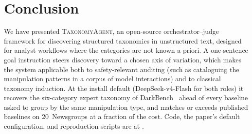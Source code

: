 \section{Conclusion}
\label{sec:conclusion}

We have presented \textsc{TaxonomyAgent}, an open-source
orchestrator--judge framework for discovering structured taxonomies
in unstructured text, designed for analyst workflows where the
categories are not known a priori. A one-sentence goal instruction
steers discovery toward a chosen axis of variation, which makes the
system applicable both to safety-relevant auditing (such as
cataloguing the manipulation patterns in a corpus of model
interactions) and to classical taxonomy induction. At the install
default (DeepSeek-v4-Flash for both roles) it recovers the six-category
expert taxonomy of DarkBench~\citep{kran2025darkbench} ahead of every
baseline asked to group by the same manipulation type, and matches or
exceeds published baselines on 20~Newsgroups at a fraction of the cost.
Code, the paper's default configuration, and reproduction scripts are
at \repourl.
